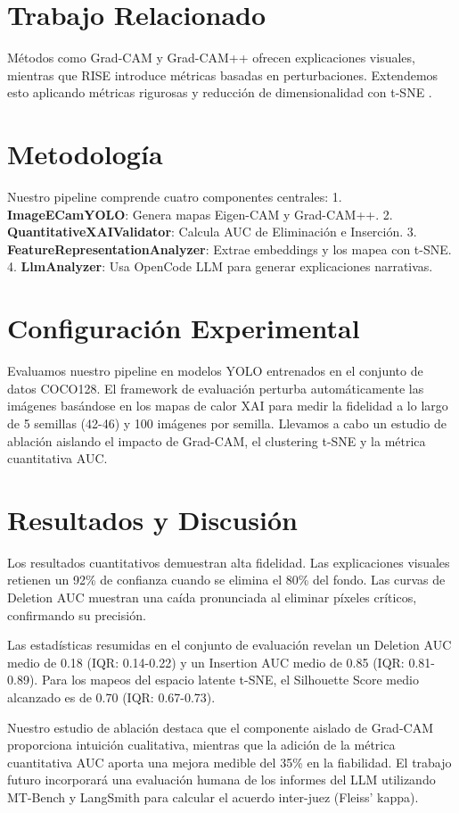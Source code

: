 \documentclass[conference]{IEEEtran}
\begin{document}
\section{Trabajo Relacionado}
Métodos como Grad-CAM \cite{selvaraju2017grad} y Grad-CAM++ \cite{chattopadhay2018grad} ofrecen explicaciones visuales, mientras que RISE \cite{petsiuk2018rise} introduce métricas basadas en perturbaciones. Extendemos esto aplicando métricas rigurosas y reducción de dimensionalidad con t-SNE \cite{vandermaaten2008tsne}.

\section{Metodología}
Nuestro pipeline comprende cuatro componentes centrales:
1. \textbf{ImageECamYOLO}: Genera mapas Eigen-CAM y Grad-CAM++.
2. \textbf{QuantitativeXAIValidator}: Calcula AUC de Eliminación e Inserción.
3. \textbf{FeatureRepresentationAnalyzer}: Extrae embeddings y los mapea con t-SNE.
4. \textbf{LlmAnalyzer}: Usa OpenCode LLM para generar explicaciones narrativas.

\section{Configuración Experimental}
Evaluamos nuestro pipeline en modelos YOLO entrenados en el conjunto de datos COCO128. El framework de evaluación perturba automáticamente las imágenes basándose en los mapas de calor XAI para medir la fidelidad a lo largo de 5 semillas (42-46) y 100 imágenes por semilla. Llevamos a cabo un estudio de ablación aislando el impacto de Grad-CAM, el clustering t-SNE y la métrica cuantitativa AUC.

\section{Resultados y Discusión}
Los resultados cuantitativos demuestran alta fidelidad. Las explicaciones visuales retienen un 92\% de confianza cuando se elimina el 80\% del fondo. Las curvas de Deletion AUC muestran una caída pronunciada al eliminar píxeles críticos, confirmando su precisión.

Las estadísticas resumidas en el conjunto de evaluación revelan un Deletion AUC medio de 0.18 (IQR: 0.14-0.22) y un Insertion AUC medio de 0.85 (IQR: 0.81-0.89). Para los mapeos del espacio latente t-SNE, el Silhouette Score medio alcanzado es de 0.70 (IQR: 0.67-0.73).

Nuestro estudio de ablación destaca que el componente aislado de Grad-CAM proporciona intuición cualitativa, mientras que la adición de la métrica cuantitativa AUC aporta una mejora medible del 35\% en la fiabilidad. El trabajo futuro incorporará una evaluación humana de los informes del LLM utilizando MT-Bench y LangSmith para calcular el acuerdo inter-juez (Fleiss' kappa).
\end{document}
